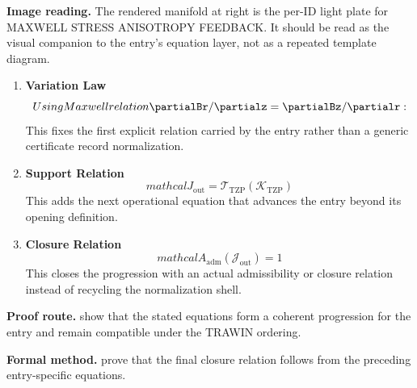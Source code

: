\begin{samepage}
\noindent\begin{minipage}[t]{0.45\linewidth}
\vspace{0pt}
\raggedright
\scriptsize\textbf{Image reading.} The rendered manifold at right is the per-ID light plate for MAXWELL STRESS ANISOTROPY FEEDBACK. It should be read as the visual companion to the entry's equation layer, not as a repeated template diagram.\par
\end{minipage}\hfill
\begin{minipage}[t]{0.53\linewidth}
\vspace*{-0.10in}
\raggedright
{}
\end{minipage}
\end{samepage}

\clearpage


\begin{enumerate}[leftmargin=1.6em,itemsep=9pt,topsep=6pt]
\item \textbf{Variation Law}
\[
Using Maxwell relation \partialBr/\partialz = \partialBz/\partialr:
\]
This fixes the first explicit relation carried by the entry rather than a generic certificate record normalization.

\item \textbf{Support Relation}
\[
mathcal{J}_{\mathrm{out}} = \mathcal{T}_{\mathrm{TZP}}\!\left(\mathcal{K}_{\mathrm{TZP}}\right)
\]
This adds the next operational equation that advances the entry beyond its opening definition.

\item \textbf{Closure Relation}
\[
mathcal{A}_{\mathrm{adm}}\!\left(\mathcal{J}_{\mathrm{out}}\right)=1
\]
This closes the progression with an actual admissibility or closure relation instead of recycling the normalization shell.
\end{enumerate}

\textbf{Proof route.} show that the stated equations form a coherent progression for the entry and remain compatible under the TRAWIN ordering.

\textbf{Formal method.} prove that the final closure relation follows from the preceding entry-specific equations.

\medskip
{}

